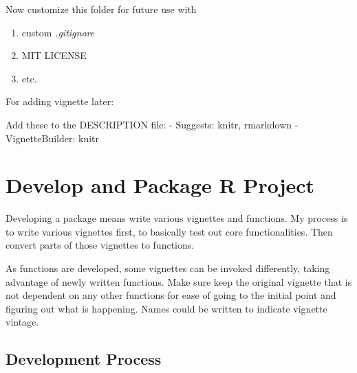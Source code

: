\documentclass[
]{article}
\providecommand{\tightlist}{%
  \setlength{\itemsep}{0pt}\setlength{\parskip}{0pt}}
\begin{document}
Now customize this folder for future use with

\begin{enumerate}
\def\labelenumi{\arabic{enumi}.}
\tightlist
\item
  custom \emph{.gitignore}
\item
  MIT LICENSE
\item
  etc.
\end{enumerate}

For adding vignette later:

Add these to the DESCRIPTION file: - Suggests: knitr, rmarkdown -
VignetteBuilder: knitr

\hypertarget{develop-and-package-r-project}{%
\section{Develop and Package R
Project}\label{develop-and-package-r-project}}

Developing a package means write various vignettes and functions. My
process is to write various vignettes first, to basically test out core
functionalities. Then convert parts of those vignettes to functions.

As functions are developed, some vignettes can be invoked differently,
taking advantage of newly written functions. Make sure keep the original
vignette that is not dependent on any other functions for ease of going
to the initial point and figuring out what is happening. Names could be
written to indicate vignette vintage.

\hypertarget{development-process}{%
\subsection{Development Process}\label{development-process}}
\end{document}

